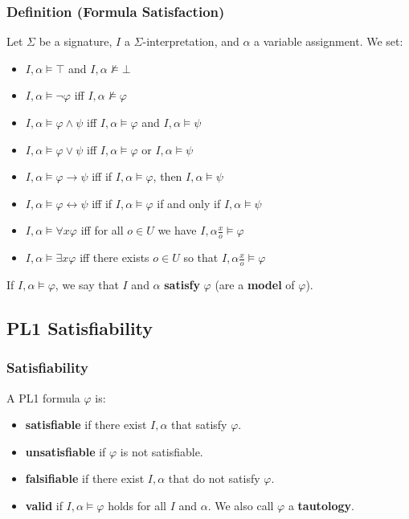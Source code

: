 \documentclass[conference]{styles/acmsiggraph}
\begin{document}
        \subsubsection{Definition (Formula Satisfaction)}
            Let $\Sigma$ be a signature, $I$ a $\Sigma$-interpretation, and $\alpha$ a variable assignment. We set:
                \begin{itemize}
                    \item $I, \alpha \vDash \top$ and $I, \alpha \nvDash \bot$
                    \item $I, \alpha \vDash \lnot \varphi$ iff $I, \alpha \nvDash \varphi$
                    \item $I, \alpha \vDash \varphi \wedge \psi$ iff $I, \alpha \vDash \varphi$ and $I, \alpha \vDash \psi$
                    \item $I, \alpha \vDash \varphi \vee \psi$ iff $I, \alpha \vDash \varphi$ or $I, \alpha \vDash \psi$
                    \item $I, \alpha \vDash \varphi \rightarrow \psi$ iff if $I, \alpha \vDash \varphi$, then $I, \alpha \vDash \psi$
                    \item $I, \alpha \vDash \varphi \leftrightarrow \psi$ iff if $I, \alpha \vDash \varphi$ if and only if $I, \alpha \vDash \psi$
                    \item $I, \alpha \vDash \forall x \varphi$ iff for all $o \in U$ we have $I, \alpha \frac{x}{o} \vDash \varphi$
                    \item $I, \alpha \vDash \exists x \varphi$ iff there exists $o \in U$ so that $I, \alpha \frac{x}{o} \vDash \varphi$
                \end{itemize}
            If $I, \alpha \vDash \varphi$, we say that $I$ and $\alpha$ \textbf{satisfy} $\varphi$ (are a \textbf{model} of $\varphi$).
        
    \subsection{PL1 Satisfiability}
        \subsubsection{Satisfiability}
            A PL1 formula $\varphi$ is:
            \begin{itemize}
                \item \textbf{satisfiable} if there exist $I, \alpha$ that satisfy $\varphi$.
                \item \textbf{unsatisfiable} if $\varphi$ is not satisfiable.
                \item \textbf{falsifiable} if there exist $I, \alpha$ that do not satisfy $\varphi$.
                \item \textbf{valid} if $I, \alpha \vDash \varphi$ holds for all $I$ and $\alpha$.
                    We also call $\varphi$ a \textbf{tautology}.
            \end{itemize}
            
\end{document}
